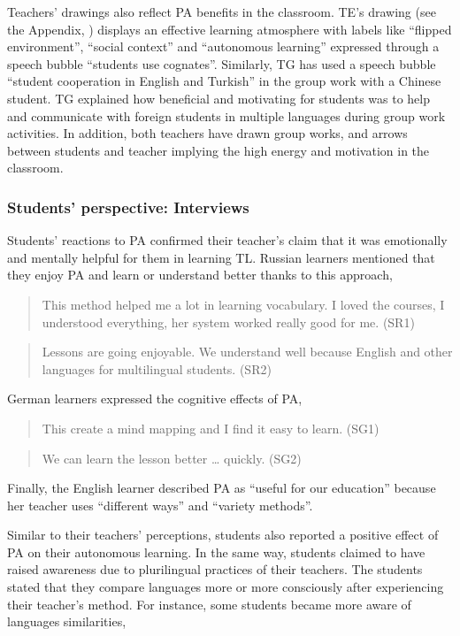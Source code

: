 \documentclass[output=paper]{../langscibook}
\begin{document}
Teachers’ drawings also reflect PA benefits in the classroom.  TE’s drawing (see the Appendix, ) displays an effective learning atmosphere with labels like “flipped environment”, “social context” and “autonomous learning” expressed through a speech bubble “students use cognates”. Similarly, TG has used a speech bubble “student cooperation in English and Turkish” in the group work with a Chinese student. TG explained how beneficial and motivating for students was to help and communicate with foreign students in multiple languages during group work activities.  In addition, both teachers have drawn group works, and arrows between students and teacher implying the high energy and motivation in the classroom.


\subsubsection{Students’ perspective: Interviews}


Students’ reactions to PA confirmed their teacher’s claim that it was emotionally and mentally helpful for them in learning TL. Russian learners mentioned that they enjoy PA and learn or understand better thanks to this approach,

\begin{quote}
This method helped me a lot in learning vocabulary. I loved the courses, I understood everything, her system worked really good for me. (SR1)
\end{quote}

\begin{quote}
Lessons are going enjoyable. We understand well because English and other languages for multilingual students. (SR2)
\end{quote}

\noindent German learners expressed the cognitive effects of PA, 

\begin{quote}
This create a mind mapping and I find it easy to learn. (SG1)
\end{quote}

\begin{quote}
We can learn the lesson better … quickly. (SG2)
\end{quote}

Finally, the English learner described PA as “useful for our education” because her teacher uses “different ways” and “variety methods”. 

Similar to their teachers’ perceptions, students also reported a positive effect of PA on their autonomous learning. In the same way, students claimed to have raised awareness due to plurilingual practices of their teachers. The students stated that they compare languages more or more consciously after experiencing their teacher’s method. For instance, some students became more aware of languages similarities, 
\end{document}
